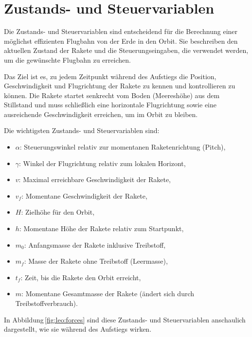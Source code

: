 %
%
%
%

\section{Zustands- und Steuervariablen \label{leo:section:variabeln}}

Die Zustands- und Steuervariablen sind entscheidend für die Berechnung einer möglichst effizienten Flugbahn von der Erde in den Orbit. 
Sie beschreiben den aktuellen Zustand der Rakete und die Steuerungseingaben, die verwendet werden, um die gewünschte Flugbahn zu erreichen. 

Das Ziel ist es, zu jedem Zeitpunkt während des Aufstiegs die Position, Geschwindigkeit und Flugrichtung der Rakete zu kennen und kontrollieren zu können. 
Die Rakete startet senkrecht vom Boden (Meereshöhe) aus dem Stillstand und muss schließlich eine horizontale Flugrichtung sowie eine ausreichende Geschwindigkeit erreichen, um im Orbit zu bleiben. 

Die wichtigsten Zustands- und Steuervariablen sind:

\begin{itemize}
	\item \(\alpha\): Steuerungswinkel relativ zur momentanen Raketenrichtung (Pitch),
	\item \(\gamma\): Winkel der Flugrichtung relativ zum lokalen Horizont,
	\item \(v\): Maximal erreichbare Geschwindigkeit der Rakete,
	\item \(v_f\): Momentane Geschwindigkeit der Rakete,
	\item \(H\): Zielhöhe für den Orbit,
	\item \(h\): Momentane Höhe der Rakete relativ zum Startpunkt,
	\item \(m_0\): Anfangsmasse der Rakete inklusive Treibstoff,
	\item \(m_f\): Masse der Rakete ohne Treibstoff (Leermasse),
	\item \(t_f\): Zeit, bis die Rakete den Orbit erreicht,
	\item \(m\): Momentane Gesamtmasse der Rakete (ändert sich durch Treibstoffverbrauch).
\end{itemize}

In Abbildung\,\ref{fig:leo:forces} sind diese Zustands- und Steuervariablen anschaulich dargestellt, wie sie während des Aufstiegs wirken.

